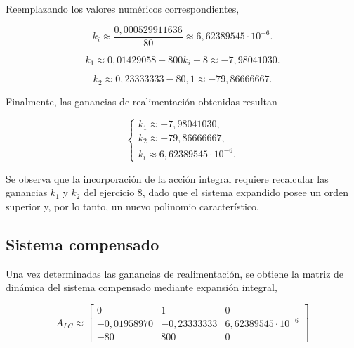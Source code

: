 \documentclass[10pt]{article}
\begin{document}
Reemplazando los valores numéricos correspondientes,

\begin{equation}
    k_i\approx
    \frac{0{,}000529911636}{80}
    \approx6{,}62389545\cdot10^{-6}.
\end{equation}

\begin{equation}
    k_1\approx0{,}01429058+800k_i-8
    \approx-7{,}98041030.
\end{equation}

\begin{equation}
    k_2\approx0{,}23333333-80{,}1
    \approx-79{,}86666667.
\end{equation}

Finalmente, las ganancias de realimentación obtenidas
resultan

\begin{equation}
    \boxed{
        \begin{cases}
            k_1\approx-7{,}98041030,\\
            k_2\approx-79{,}86666667,\\
            k_i\approx6{,}62389545\cdot10^{-6}.
        \end{cases}
    }
    \label{eq:ej10_ganancias}
\end{equation}

Se observa que la incorporación de la acción integral
requiere recalcular las ganancias $k_1$ y $k_2$ del
ejercicio 8, dado que el sistema expandido posee
un orden superior y, por lo tanto, un nuevo polinomio
característico.


\subsection{Sistema compensado}

Una vez determinadas las ganancias de realimentación,
se obtiene la matriz de dinámica del sistema
compensado mediante expansión integral,

\begin{equation}
    \boxed{
        A_{LC}\approx
        \begin{bmatrix}
            0 & 1 & 0\\
            -0{,}01958970 & -0{,}23333333 &
            6{,}62389545\cdot10^{-6}\\
            -80 & 800 & 0
        \end{bmatrix}
    }
    \label{eq:ej10_alc}
\end{equation}
\end{document}
